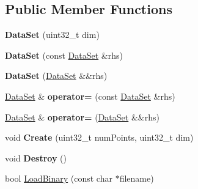 \subsection*{Public Member Functions}
\begin{DoxyCompactItemize}
\item 
\hypertarget{struct_d_r_d_s_p_1_1_data_set_ae1212b5491e3c0a478da1910952e2bc2}{{\bfseries Data\-Set} (uint32\-\_\-t dim)}\label{struct_d_r_d_s_p_1_1_data_set_ae1212b5491e3c0a478da1910952e2bc2}

\item 
\hypertarget{struct_d_r_d_s_p_1_1_data_set_a54362d191e61148507f2fca3b4558cc3}{{\bfseries Data\-Set} (const \hyperlink{struct_d_r_d_s_p_1_1_data_set}{Data\-Set} \&rhs)}\label{struct_d_r_d_s_p_1_1_data_set_a54362d191e61148507f2fca3b4558cc3}

\item 
\hypertarget{struct_d_r_d_s_p_1_1_data_set_afb512480181cf243960cd6af9c8f07aa}{{\bfseries Data\-Set} (\hyperlink{struct_d_r_d_s_p_1_1_data_set}{Data\-Set} \&\&rhs)}\label{struct_d_r_d_s_p_1_1_data_set_afb512480181cf243960cd6af9c8f07aa}

\item 
\hypertarget{struct_d_r_d_s_p_1_1_data_set_a3cfc4b016689711854acd45637e893ef}{\hyperlink{struct_d_r_d_s_p_1_1_data_set}{Data\-Set} \& {\bfseries operator=} (const \hyperlink{struct_d_r_d_s_p_1_1_data_set}{Data\-Set} \&rhs)}\label{struct_d_r_d_s_p_1_1_data_set_a3cfc4b016689711854acd45637e893ef}

\item 
\hypertarget{struct_d_r_d_s_p_1_1_data_set_adc4d9c3292d47ee1b5ab110dd04e9166}{\hyperlink{struct_d_r_d_s_p_1_1_data_set}{Data\-Set} \& {\bfseries operator=} (\hyperlink{struct_d_r_d_s_p_1_1_data_set}{Data\-Set} \&\&rhs)}\label{struct_d_r_d_s_p_1_1_data_set_adc4d9c3292d47ee1b5ab110dd04e9166}

\item 
\hypertarget{struct_d_r_d_s_p_1_1_data_set_a714db7eb5bf512b3c1746e41da8e4859}{void {\bfseries Create} (uint32\-\_\-t num\-Points, uint32\-\_\-t dim)}\label{struct_d_r_d_s_p_1_1_data_set_a714db7eb5bf512b3c1746e41da8e4859}

\item 
\hypertarget{struct_d_r_d_s_p_1_1_data_set_a65d09f3c71c115517a5df8ce96f26117}{void {\bfseries Destroy} ()}\label{struct_d_r_d_s_p_1_1_data_set_a65d09f3c71c115517a5df8ce96f26117}

\item 
\hypertarget{struct_d_r_d_s_p_1_1_data_set_a0ffb95866863d3b2bad35b0c68c6c7f3}{bool \hyperlink{struct_d_r_d_s_p_1_1_data_set_a0ffb95866863d3b2bad35b0c68c6c7f3}{Load\-Binary} (const char $\ast$filename)}\label{struct_d_r_d_s_p_1_1_data_set_a0ffb95866863d3b2bad35b0c68c6c7f3}


\end{DoxyCompactItemize}
